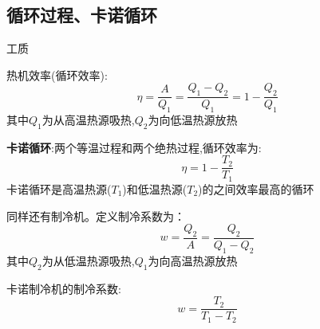 \documentclass[10pt,a4paper]{article}
\begin{document}
\subsection{循环过程、卡诺循环}
工质

热机效率(循环效率):
\[\eta=\frac{A}{Q_1}=\frac{Q_1-Q_2}{Q_1}=1-\frac{Q_2}{Q_1}\]
其中$Q_1$为从高温热源吸热,$Q_2$为向低温热源放热

\textbf{卡诺循环}:两个等温过程和两个绝热过程,循环效率为:
\[\boxed{\eta=1-\frac{T_2}{T_1}}\]
卡诺循环是高温热源($T_1$)和低温热源($T_2$)的之间效率最高的循环

同样还有制冷机。定义制冷系数为：
\[w=\frac{Q_2}{A}=\frac{Q_2}{Q_1-Q_2}\]
其中$Q_2$为从低温热源吸热,$Q_1$为向高温热源放热

卡诺制冷机的制冷系数:
\[w=\frac{T_2}{T_1-T_2}\]
\end{document}
